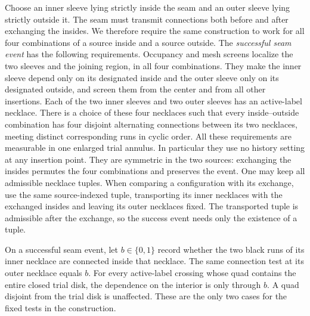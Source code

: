 Choose an inner sleeve lying strictly inside the seam and an outer sleeve
lying strictly outside it.  The seam must transmit connections both before
and after exchanging the insides.  We therefore require the same
construction to work for all four combinations of a source inside and a
source outside.  The \emph{successful seam event} has the following
requirements.  Occupancy and mesh screens localize the
two sleeves and the joining region, in all four combinations.  They make
the inner sleeve depend only on its designated inside and the outer sleeve
only on its designated outside, and screen them from the center and from
all other insertions.  Each of the two inner sleeves and two outer sleeves
has an active-label necklace.  There is a choice of these four necklaces
such that every inside--outside combination has four disjoint alternating
connections between its two necklaces, meeting distinct corresponding
runs in cyclic order.  All these requirements are measurable in one
enlarged trial annulus.  In particular they use no history setting at any
insertion point.  They are symmetric in the two sources: exchanging the
insides permutes the four combinations and preserves the event.  One may
keep all admissible necklace tuples.  When comparing a configuration
with its exchange, use the same source-indexed tuple, transporting its inner
necklaces with the exchanged insides and leaving its outer necklaces fixed.
The transported tuple is admissible after the exchange, so the success
event needs only the existence of a tuple.

\begin{lemma}
\label{lem:necklace-bit}
On a successful seam event, let $b\in\{0,1\}$ record whether the two black
runs of its inner necklace are connected inside that necklace.  The same
connection test at its outer necklace equals $b$.  For every active-label
crossing whose quad contains the entire closed trial disk, the dependence
on the interior is only through $b$.  A quad disjoint from the trial disk
is unaffected.  These are the only two cases for the fixed tests in the
construction.
\end{lemma}

